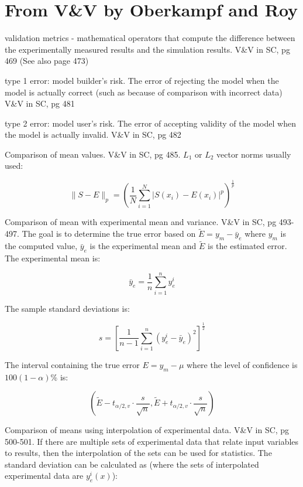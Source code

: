 \documentclass{article}
\begin{document}
\section{From V\&V by Oberkampf and Roy}

validation metrics - mathematical operators that compute the difference between the experimentally measured results and the simulation results.  V\&V in SC, pg 469 (See also page 473)

type 1 error: model builder's risk.  The error of rejecting the model when the model is actually correct (such as because of comparison with incorrect data) V\&V in SC, pg 481

type 2 error: model user's risk.  The error of accepting validity of the model when the model is actually invalid.  V\&V in SC, pg 482


Comparison of mean values.  V\&V in SC, pg 485.  $L_1$ or $L_2$ vector norms usually used:

\begin{equation}
  \| S - E \|_p = \left(\frac{1}{N}\sum^N_{i=1} | S(x_i) - E(x_i)|^p \right)^\frac{1}{p}
\end{equation}

Comparison of mean with experimental mean and variance. V\&V in SC, pg
493-497.  The goal is to determine the true error based on $\tilde{E}
= y_m - \bar{y}_e$ where $y_m$ is the computed value, $\bar{y}_e$ is
the experimental mean and $\tilde{E}$ is the estimated error.  The
experimental mean is:

\begin{equation}
  \bar{y}_e = \frac{1}{n} \sum^n_{i=1} y^i_e
\end{equation}

The sample standard deviations is:

\begin{equation}
  s = \left[ \frac{1}{n-1} \sum^n_{i=1} (y^i_e - \bar{y}_e)^2 \right ]^\frac{1}{2}
\end{equation}

The interval containing the true error $E = y_m - \mu$ where the level of confidence is $100(1-\alpha)$\% is:

\begin{equation}
  \left ( \tilde{E}-t_{\alpha/2,v}\cdot\frac{s}{\sqrt{n}},\tilde{E}+t_{\alpha/2,v}\cdot\frac{s}{\sqrt{n}}  \right )
\end{equation}

Comparison of means using interpolation of experimental data. V\&V in
SC, pg 500-501.  If there are multiple sets of experimental data that
relate input variables to results, then the interpolation of the sets
can be used for statistics.  The standard deviation can be calculated
as (where the sets of interpolated experimental data are $y^i_e(x)$):
\end{document}
